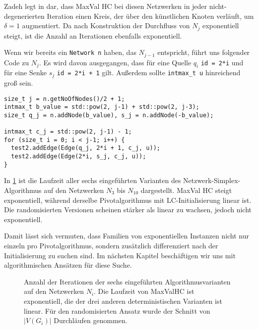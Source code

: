 Zadeh legt in \cite[S. 263\,f.]{Exponential} dar, dass MaxVal HC bei diesen Netzwerken in jeder nicht-degenerierten Iteration einen Kreis, der über den künstlichen Knoten verläuft, um $\delta=1$ augmentiert. Da nach Konstruktion der Durchfluss von $N_j$ exponentiell steigt, ist die Anzahl an Iterationen ebenfalls exponentiell.

Wenn wir bereits ein \lstinline|Network n| haben, das $N_{j-1}$ entspricht, führt uns folgender Code zu $N_{j}$. Es wird davon ausgegangen, dass für eine Quelle $q_i$ \lstinline|id = 2*i| und für eine Senke $s_j$ \lstinline|id = 2*i + 1| gilt. Außerdem sollte \lstinline|intmax_t u| hinreichend groß sein.

\begin{lstlisting}
size_t j = n.getNoOfNodes()/2 + 1;
intmax_t b_value = std::pow(2, j-1) + std::pow(2, j-3);
size_t q_j = n.addNode(b_value), s_j = n.addNode(-b_value);

intmax_t c_j = std::pow(2, j-1) - 1;
for (size_t i = 0; i < j-1; i++) {
  test2.addEdge(Edge(q_j, 2*i + 1, c_j, u));
  test2.addEdge(Edge(2*i, s_j, c_j, u));
}
\end{lstlisting}

In \cref{fig:plot_exp} ist die Laufzeit aller sechs eingeführten Varianten des Netzwerk-Simplex-Algorithmus auf den Netzwerken $N_3$ bis $N_{10}$ dargestellt. MaxVal HC steigt exponentiell, während derselbe Pivotalgorithmus mit LC-Initialisierung linear ist. Die randomisierten Versionen scheinen stärker als linear zu wachsen, jedoch nicht exponentiell.

Damit lässt sich vermuten, dass Familien von exponentiellen Instanzen nicht nur einzeln pro Pivotalgorithmus, sondern zusätzlich differenziert nach der Initialisierung zu suchen sind. Im nächsten Kapitel beschäftigen wir uns mit algorithmischen Ansätzen für diese Suche. 

\begin{figure}[!ht]\centering
    
    \caption{Anzahl der Iterationen der sechs eingeführten Algorithmusvarianten auf den Netzwerken $N_i$. Die Laufzeit von MaxValHC ist exponentiell, die der drei anderen deterministischen Varianten ist linear. Für den randomisierten Ansatz wurde der Schnitt von $|V(G_i)|$ Durchläufen genommen.}
    \label{fig:plot_exp}
\end{figure}

